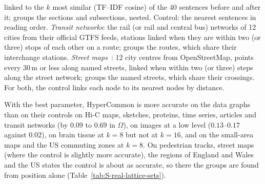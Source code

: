 linked to the $k$ most similar (TF--IDF cosine) of the 40 sentences before and after it;
groups the sections and subsections, nested. Control: the nearest sentences in reading
order.
\emph{Transit networks}: the rail (or rail and central bus) networks of 12 cities from
their official GTFS feeds, stations linked when they are within two (or three) stops of
each other on a route; groups the routes, which share their interchange stations.
\emph{Street maps}~\cite{haklay2008openstreetmap}: 12 city centres from OpenStreetMap,
points every $30$\,m or less along named streets, linked when within two (or three)
steps along the street network; groups the named streets, which share their crossings.
For both, the control links each node to its nearest nodes by distance.

With the best parameter, HyperCommon is more accurate on the data graphs than on their
controls on Hi-C maps, sketches, proteins, time series, articles and transit networks
(by $0.09$ to $0.69$ in $\Omega$), on images at a low level ($0.13$--$0.17$ against
$0.02$), on brain tissue at $k=8$ but not at $k=16$, and on the small-area maps and the
US commuting zones at $k=8$. On pedestrian tracks, street maps (where the control is
slightly more accurate), the regions of England and Wales and the US states the control
is about as accurate, so there the groups are found from position alone
(Table~\ref{tab:S-real-lattice-sets}).


